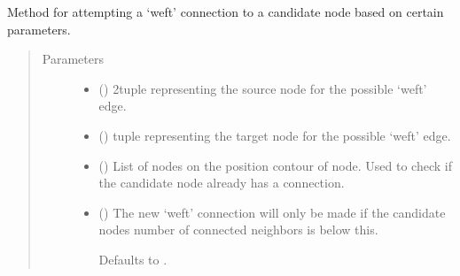 \documentclass[letterpaper,10pt,english]{sphinxmanual}
\begin{document}
\begin{fulllineitems}
\begin{fulllineitems}
\end{fulllineitems}


\begin{fulllineitems}
\label{\detokenize{cockatoo:cockatoo.KnitNetwork.attempt_weft_connection}}
Method for attempting a ‘weft’ connection to a candidate
node based on certain parameters.
\begin{quote}\begin{description}
\item[{Parameters}] \leavevmode\begin{itemize}
\item {} 
 () \textendash{} 2\sphinxhyphen{}tuple representing the source node for the possible ‘weft’ edge.

\item {} 
 () \textendash{} \sphinxhyphen{}tuple representing the target node for the possible ‘weft’ edge.

\item {} 
 () \textendash{} List of nodes on the position contour of node. Used to check if
the candidate node already has a connection.

\item {} 
 (\sphinxstyleliteralemphasis{\sphinxupquote{, }}) \textendash{} 
The new ‘weft’ connection will only be made if the candidate nodes
number of connected neighbors is below this.

Defaults to .



\end{itemize}
\end{description}
\end{quote}
\end{fulllineitems}
\end{fulllineitems}
\end{document}
